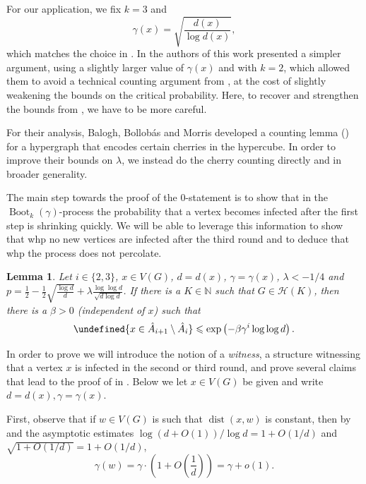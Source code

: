 \documentclass[reqno,a4paper,11pt]{amsart}
\newtheorem{lemma}[theorem]{Lemma}
\theoremstyle{definition}
\newcommand{\Boot}{\operatorname{Boot}}
\newcommand{\dist}{\operatorname{dist}}
\renewcommand{\leq}{\leqslant}
\let\Pr\undefined
\begin{document}
For our application, we fix $k=3$ and
\[
  \gamma(x)= \sqrt{\frac{d(x)}{\log d(x)}},
\]
which matches the choice in \cite{BaBoMo2009}.
In \cite{CEGK24} the authors of this work presented a simpler argument, using a slightly larger value of $\gamma(x)$ and with $k=2$, which allowed them to avoid a technical counting argument from \cite{BaBoMo2009}, at the cost of slightly weakening the bounds on the critical probability.
Here, to recover and strengthen the bounds from \cite{BaBoMo2009}, we have to be more careful.

For their analysis, Balogh, Bollob\'{a}s and Morris developed a counting lemma (\cite[Lemma 5.4]{BaBoMo2009}) for a hypergraph that encodes certain cherries in the hypercube.
In order to improve their bounds on $\lambda$, we instead do the cherry counting directly and in broader generality.

The main step towards the proof of the $0$-statement is to show that in the $\Boot_k(\gamma)$-process the probability that a vertex becomes infected after the first step is shrinking quickly.
We will be able to leverage this information to show that whp no new vertices are infected after the third round and to deduce that whp the process does not percolate.
\begin{lemma}\label{l:xinAi+1-Ai}
  Let $i \in \{2, 3\}$, $x \in V(G)$, $d=d(x)$, $\gamma=\gamma(x)$, $\lambda < -1/4$ and $p = \frac{1}{2}-\frac{1}{2} \sqrt{\frac{\log d}{d}} + \lambda \frac{\log \log d}{\sqrt{d \log d}}$.
  If there is a $K \in \mathbb{N}$ such that $G \in \mathcal{H}(K)$, then there is a $\beta >0$ (independent of $x$) such that
  \[
    \Pr{x \in \hat{A}_{i+1} \setminus \hat{A}_i} \leq \exp\left(-\beta \gamma^i \log \log d\right).
  \]
\end{lemma}

In order to prove  we will introduce the notion of a \emph{witness}, a structure witnessing that a vertex $x$ is infected in the second or third round, and prove several claims that lead to the proof of  in .
Below we let $x \in V(G)$ be given and write $d=d(x), \gamma=\gamma(x)$.

First, observe that if $w \in V(G)$ is such that $\dist(x, w)$ is constant, then by  and the asymptotic estimates $\log (d + O(1))/\log d = 1 + O(1/d)$ and $\sqrt{1 + O(1/d)} = 1 + O(1/d)$,
\begin{equation}\label{e:gammaconstant}
  \gamma(w) = \gamma \cdot \left(1 + O\left(\frac{1}{d}\right)\right) = \gamma + o(1).
\end{equation}
\end{document}
